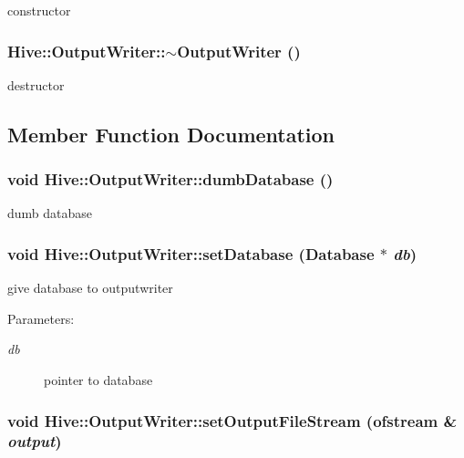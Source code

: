 constructor 

\subsubsection[$\sim$OutputWriter]{\setlength{\rightskip}{0pt plus 5cm}Hive::OutputWriter::$\sim$OutputWriter ()}\label{classHive_1_1OutputWriter_062ec1fa9360b0030f6586b8267cf977}


destructor 



\subsection{Member Function Documentation}
\subsubsection[dumbDatabase]{\setlength{\rightskip}{0pt plus 5cm}void Hive::OutputWriter::dumbDatabase ()}\label{classHive_1_1OutputWriter_6a62b1a132128de629b8609d3e471cbf}


dumb database 
\subsubsection[setDatabase]{\setlength{\rightskip}{0pt plus 5cm}void Hive::OutputWriter::setDatabase ({\bf Database} $\ast$ {\em db})}\label{classHive_1_1OutputWriter_13533399b709ee1451862915dca44f89}


give database to outputwriter \begin{Desc}
\item[Parameters:]
\begin{description}
\item[{\em db}]pointer to database \end{description}
\end{Desc}
\subsubsection[setOutputFileStream]{\setlength{\rightskip}{0pt plus 5cm}void Hive::OutputWriter::setOutputFileStream (ofstream \& {\em output})}\label{classHive_1_1OutputWriter_1f38a4e3b701abc5811a20370af27a08}


